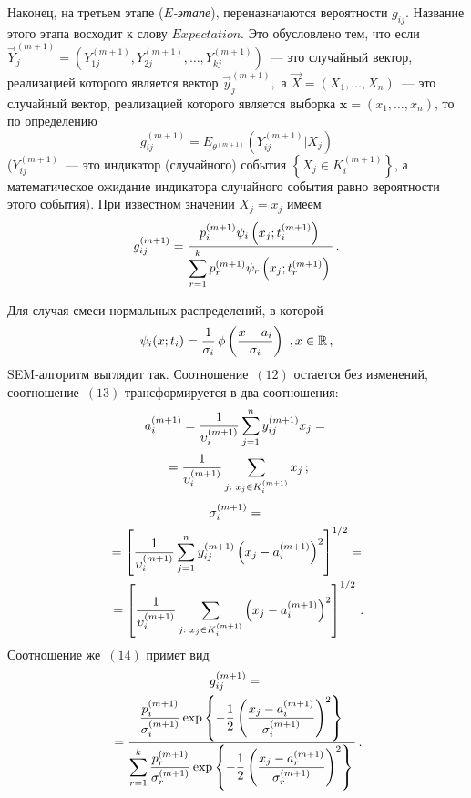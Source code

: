 \begin{multicols}{2}
Наконец, на третьем
этапе ($E$\textit{-этапе}), переназначаются вероятности $g_{ij}$. Название
этого этапа восходит к слову $Expectation$. Это обусловлено тем,
что если
$\vec{Y}_{j}^{(m+1)}=\left ( Y_{1j}^{(m+1)},Y_{2j}^{(m+1)},\ldots,Y_{kj}^{(m+1)}\right )$~---
это случайный вектор, реализацией которого является вектор
$\vec{y}_{j}^{(m+1)},$ а $\vec{X}=(X_{1},\ldots,X_{n})$~--- это
случайный вектор, реализацией которого является\linebreak
выборка $\mathbf{x}=(x_{1}%
,\ldots,x_{n})$, то по определению%
$$
g_{ij}^{(m+1)}=E_{\theta^{(m+1)}}\left ( Y_{ij}^{(m+1)}|X_{j}\right )
$$
($Y_{ij}^{(m+1)}$~--- это индикатор (случайного) события $\left \{
X_{j}\in K_{i}^{(m+1)}\right \}$, а математическое ожидание
индикатора случайного события равно вероятности этого события).
При известном значении $X_{j}=x_{j}$ имеем
\begin{equation}
g_{ij}^{(m+1)}=\fr{p_{i}^{(m+1)}\psi_{i}\left (x_{j};t_{i}^{(m+1)}\right )}%
{\sum\limits_{r=1}^{k}p_{r}^{(m+1)}\psi_{r}\left(x_{j};t_{r}^{(m+1)}\right)}%
\,.
\end{equation}

Для случая смеси нормальных распределений,
в которой%
$$
\psi_{i}(x;t_{i})=\fr{1}{\sigma_{i}}\,\phi\left(  \fr{x-a_{i}}{\sigma_{i}%
}\right)\  ,x\in%
\mathbb{R} \,,
$$
SEM-алгоритм выглядит так. Соотношение~$(12)$ остается без
изменений, соотношение~$(13)$ трансформируется
в два соотношения:
\begin{multline}
a_{i}^{(m+1)}=\fr{1}{\upsilon_{i}^{(m+1)}}\sum\limits_{j=1}^{n}
y_{ij}^{(m+1)}x_{j}={}\\
{}=\fr{1}{\upsilon_{i}^{(m+1)}}\sum\limits_{j:\text{ }%
x_{j}\in K_{i}^{(m+1)}}x_{j}\,;
\end{multline}
\begin{multline*}
\sigma_{i}^{(m+1)}={}\\
{}=\left[  \fr{1}{\upsilon_{i}^{(m+1)}}\sum\limits_{j=1}%
^{n}y_{ij}^{(m+1)}\left(  x_{j}-a_{i}^{(m+1)}\right)  ^{2}\right]^{1/2}={}
\\
{}
=\left[ \fr{1}{\upsilon_{i}^{(m+1)}}\sum\limits_{j:\text{
}x_{j}\in
K_{i}^{(m+1)}}\left(  x_{j}-a_{i}^{(m+1)}\right)  ^{2}\right]^{1/2}\,.
\end{multline*}
Соотношение же~$(14)$ примет вид
\begin{multline*}
g_{ij}^{(m+1)}={}\\
{}=\fr{\fr{p_{i}^{(m+1)}}{\sigma_{i}^{(m+1)}}\exp\left\{
-\fr{1}{2}\left(
\fr{x_{j}-a_{i}^{(m+1)}}{\sigma_{i}^{(m+1)}}\right)^{2}\right\}  }
{\sum\limits_{r=1}^{k}\fr{p_{r}^{(m+1)}}{\sigma_{r}^{(m+1)}%
}\exp\left\{  -\fr{1}{2}\left(  \fr{x_{j}-a_{r}^{(m+1)}}{\sigma
_{r}^{(m+1)}}\right)^{2}\right\}  }\,.
\end{multline*}



\end{multicols}

